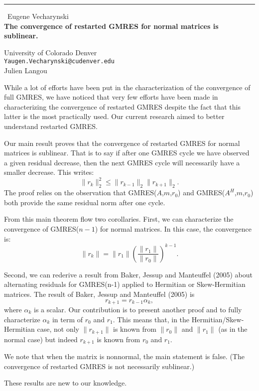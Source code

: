 \documentclass{report}
\begin{document}
\begin{center}
\rule{6in}{1pt} \
{\large Eugene Vecharynski \\
{\bf The convergence of restarted GMRES for normal matrices is sublinear.}}

University of Colorado Denver
\\
{\tt Yaugen.Vecharynski@cudenver.edu}\\
Julien Langou\end{center}

While a lot of efforts have been put in the characterization of the
convergence of full GMRES, we have noticed that very few efforts have
been made in characterizing the convergence of restarted GMRES despite
the fact that this latter is the most practically used. Our current
research aimed to better understand restarted GMRES.

Our main result proves that the convergence of restarted GMRES for normal
matrices is sublinear. That is to say if after one GMRES cycle we have
observed a given residual decrease, then the next GMRES cycle will
necessarily have a smaller decrease. This writes:
$$ \| r_k \|_2^2 \leq \| r_{k-1} \|_2 \|r_{k+1} \|_2. $$
The proof relies on the observation that GMRES($A$,$m$,$r_0$) and
GMRES($A^H$,$m$,$r_0$) both provide the same residual norm after one
cycle.

From this main theorem flow two corollaries. First, we can characterize
the convergence of GMRES($n-1$) for normal matrices. In this case, the
convergence is:
$$ \| r_k \| = \| r_1 \| \left( \frac{ \|r_1\| } { \| r_0 \| } \right)^{k-1} .$$

Second, we can rederive a result from Baker, Jessup and Manteuffel (2005)
about alternating residuals for GMRES(n-1) applied to Hermitian or
Skew-Hermitian matrices. The result of Baker, Jessup and Manteuffel
(2005) is
$$ r_{k+1} = r_{k-1} \alpha_k,$$
where $\alpha_k$ is a scalar.
Our contribution is to present another proof and to fully characterize
$\alpha_k$ in term of $r_0$ and $r_1$. This means that, in the
Hermitian/Skew-Hermitian case, not only $ \| r_{k+1} \|$ is known from
$\|r_0\|$ and $\|r_1\|$ (as in the normal case) but indeed $ r_{k+1} $ is
known from $r_0$ and $r_1$.

We note that when the matrix is nonnormal, the main statement is false.
(The convergence of restarted GMRES is not necessarily sublinear.)

These results are new to our knowledge. 
\end{document}

